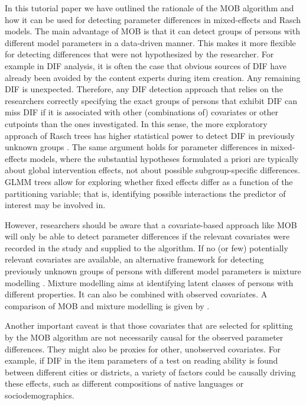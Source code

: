 \documentclass[doc,floatsintext,natbib]{apa7}
\begin{document}
In this tutorial paper we have outlined the rationale of the MOB algorithm and how it can be used for detecting parameter differences in mixed-effects and Rasch models. The main advantage of MOB is that it can detect groups of persons with different model parameters in a data-driven manner. This makes it more flexible for detecting differences that were not hypothesized by the researcher. For example in DIF analysis, it is often the case that obvious sources of DIF have already been avoided by the content experts during item creation. Any remaining DIF is unexpected. Therefore, any DIF detection approach that relies on the researchers correctly specifying the exact groups of persons that exhibit DIF can miss DIF if it is associated with other (combinations of) covariates or other cutpoints than the ones investigated. In this sense, the more exploratory approach of Rasch trees has higher statistical power to detect DIF in previously unknown groups \citep{StrKopZei:2015:P}. The same argument holds for parameter differences in mixed-effects models, where the substantial hypotheses formulated a priori are typically about global intervention effects, not about possible subgroup-specific differences. GLMM trees allow for exploring whether fixed effects differ as a function of the partitioning variable; that is, identifying possible interactions the predictor of interest may be involved in.

However, researchers should be aware that a covariate-based approach like MOB will only be able to detect parameter differences if the relevant covariates were recorded in the study and supplied to the algorithm. If no (or few) potentially relevant covariates are available, an alternative framework for detecting previously unknown groups of persons with different model parameters is mixture modelling \citep[see, e.g.,][in the context of Rasch modelling]{AyalySant17,FriStrZei:2015:EaPM}. Mixture modelling aims at identifying latent classes of persons with different properties. It can also be combined with observed covariates. A comparison of MOB and mixture modelling is given by \citet{FriStrZei:2014}.

Another important caveat is that those covariates that are selected for splitting by the MOB algorithm are not necessarily causal for the observed parameter differences. They might also be proxies for other, unobserved covariates. For example, if DIF in the item parameters of a test on reading ability is found between different cities or districts, a variety of factors could be causally driving these effects, such as different compositions of native languages or sociodemographics. 
\end{document}
